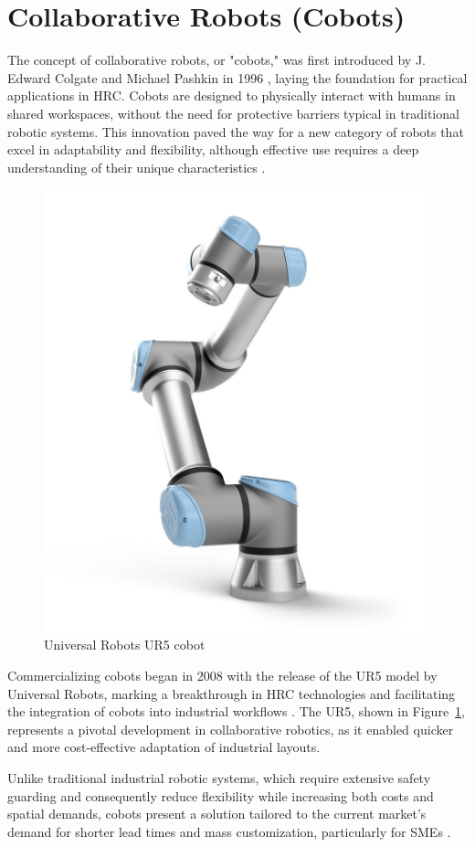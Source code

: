 \section{Collaborative Robots (Cobots)} 

The concept of collaborative robots, or "cobots," was first introduced by J. Edward Colgate and Michael Pashkin in 1996 \cite{cobot-definition}, laying the foundation for practical applications in \ac{HRC}. Cobots are designed to physically interact with humans in shared workspaces, without the need for protective barriers typical in traditional robotic systems. This innovation paved the way for a new category of robots that excel in adaptability and flexibility, although effective use requires a deep understanding of their unique characteristics \cite{robotics8040100}.

\begin{figure}[!htbp]
    \centering
    \includegraphics[width=0.4\linewidth]{figs/ur5.jpg}
    \caption{Universal Robots UR5 cobot} 
    \label{fig:ur5}
\end{figure} 

Commercializing cobots began in 2008 with the release of the UR5 model by Universal Robots, marking a breakthrough in \ac{HRC} technologies and facilitating the integration of cobots into industrial workflows \cite{robotics8040100}. The UR5, shown in Figure~\ref{fig:ur5}, represents a pivotal development in collaborative robotics, as it enabled quicker and more cost-effective adaptation of industrial layouts.

Unlike traditional industrial robotic systems, which require extensive safety guarding and consequently reduce flexibility while increasing both costs and spatial demands, cobots present a solution tailored to the current market's demand for shorter lead times and mass customization, particularly for \ac{SMEs} \cite{barbazza2017agility}.

